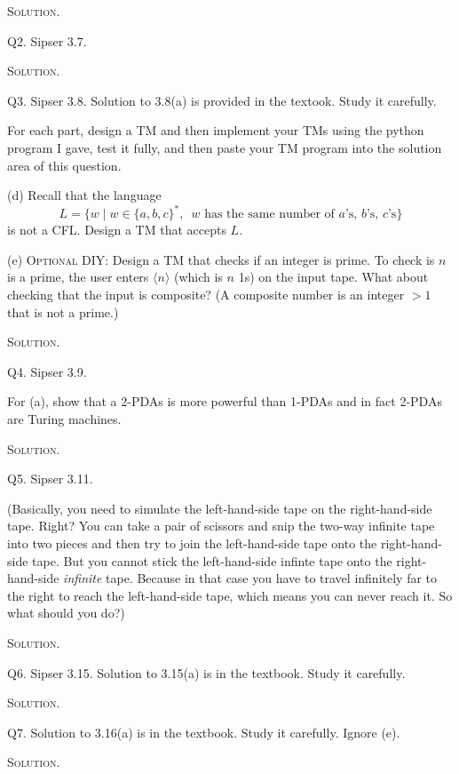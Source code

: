\textsc{Solution}.



\newpage
Q2. Sipser 3.7.

\textsc{Solution}.



\newpage
Q3. Sipser 3.8.
Solution to 3.8(a) is provided in the textook. Study it carefully.

For each part, design a TM and then
implement your TMs using the python
program I gave, test it fully, and then paste your TM program into the
solution area of this question.

(d)
Recall that
the language
\[
L = \{w \mid w \in \{a, b, c\}^*, \,\,\,
\text{$w$ has the same number of $a$'s, $b$'s, $c$'s} \}
\]
is not a CFL.
Design a TM that accepts $L$.

(e) \textsc{Optional DIY:}
Design a TM that checks if an integer is prime.
To check is $n$ is a prime, the user enters
$\langle n \rangle$ (which is $n$ 1s) on the input tape.
What about checking that the input is composite?
(A composite number is an integer $> 1$ that is not a prime.)

\textsc{Solution}.



\newpage
Q4. Sipser 3.9.

For (a), show that a 2-PDAs is more powerful than 1-PDAs and in fact
2-PDAs are Turing machines.

\textsc{Solution}.



\newpage
Q5. Sipser 3.11.

(Basically, you need to simulate the left-hand-side tape on the right-hand-side tape.
Right?
You can take a pair of scissors and snip the two-way infinite tape into two pieces
and then try to join the left-hand-side tape onto the right-hand-side tape.
But you cannot stick the left-hand-side infinte tape onto the right-hand-side \textit{infinite} tape.
Because in that case you have to travel infinitely far to the right
to reach the left-hand-side tape, which means you can never reach it.
So what should you do?)

\textsc{Solution}.




\newpage
Q6. Sipser 3.15. 
Solution to 3.15(a) is in the textbook. Study it carefully.

\textsc{Solution}.



\newpage
Q7.
Solution to 3.16(a) is in the textbook. Study it carefully.
Ignore (e).

\textsc{Solution}.




